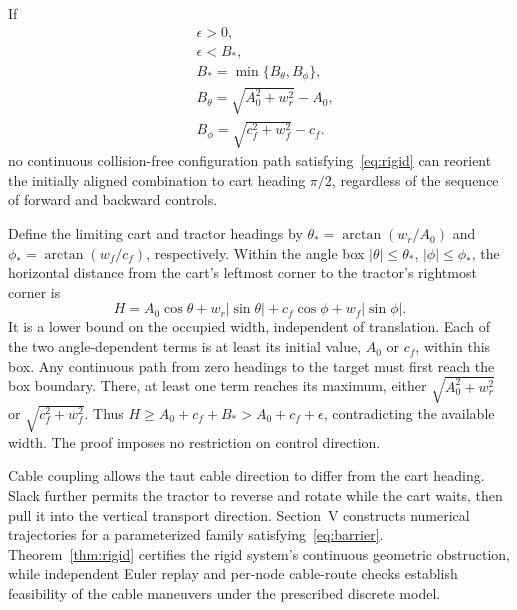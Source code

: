 \begin{theorem}
If
\begin{equation}
\begin{aligned}
 &\epsilon>0,\\
 &\epsilon<B_*,\\
 &B_*=\min\{B_\theta,B_\phi\},\\
 &B_\theta=\sqrt{A_0^2+w_r^2}-A_0,\\
 &B_\phi=\sqrt{c_f^2+w_f^2}-c_f.
\end{aligned}
\label{eq:barrier}
\end{equation}
no continuous collision-free configuration path satisfying~\eqref{eq:rigid} can reorient the initially aligned combination to cart heading $\pi/2$, regardless of the sequence of forward and backward controls.
\label{thm:rigid}
\end{theorem}
\begin{IEEEproof}
Define the limiting cart and tractor headings by $\theta_*=\arctan(w_r/A_0)$ and $\phi_*=\arctan(w_f/c_f)$, respectively. Within the angle box $|\theta|\leq\theta_*$, $|\phi|\leq\phi_*$, the horizontal distance from the cart's leftmost corner to the tractor's rightmost corner is
\begin{equation}
H=A_0\cos\theta+w_r|\sin\theta|
+c_f\cos\phi+w_f|\sin\phi|.
\label{eq:span}
\end{equation}
It is a lower bound on the occupied width, independent of translation. Each of the two angle-dependent terms is at least its initial value, $A_0$ or $c_f$, within this box. Any continuous path from zero headings to the target must first reach the box boundary. There, at least one term reaches its maximum, either $\sqrt{A_0^2+w_r^2}$ or $\sqrt{c_f^2+w_f^2}$. Thus $H\geq A_0+c_f+B_*>A_0+c_f+\epsilon$, contradicting the available width. The proof imposes no restriction on control direction.
\end{IEEEproof}

Cable coupling allows the taut cable direction to differ from the cart heading. Slack further permits the tractor to reverse and rotate while the cart waits, then pull it into the vertical transport direction. Section~V constructs numerical trajectories for a parameterized family satisfying~\eqref{eq:barrier}. Theorem~\ref{thm:rigid} certifies the rigid system's continuous geometric obstruction, while independent Euler replay and per-node cable-route checks establish feasibility of the cable maneuvers under the prescribed discrete model.
